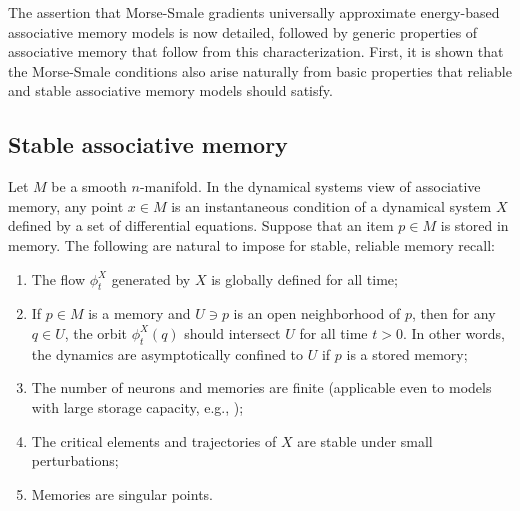 \documentclass[12pt]{article}
\begin{document}
The assertion that Morse-Smale gradients universally approximate energy-based associative memory models is now detailed, followed by generic properties of associative memory that follow from this characterization. First, it is shown that the Morse-Smale conditions also arise naturally from basic properties that reliable and stable associative memory models should satisfy.

\subsection{Stable associative memory}
\label{subsection:general-aspects-of-associative-memory}

Let $M$ be a smooth $n$-manifold. In the dynamical systems view of associative memory, any point $x \in M$ is an instantaneous condition of a dynamical system $X$ defined by a set of differential equations. Suppose that an item $p\in M$ is stored in memory. The following are natural to impose for stable, reliable memory recall: 
\begin{enumerate}[itemsep=0pt]
    \item The flow $\phi_t^X$ generated by $X$ is globally defined for all time;
    \item If $p \in M$ is a memory and $U \ni p$ is an open neighborhood of $p$, then for any $q\in U$, the orbit $\phi_t^X(q)$ should intersect $U$ for all time $t > 0$. In other words, the dynamics are asymptotically confined to $U$ if $p$ is a stored memory;
    \item The number of neurons and memories are finite (applicable even to models with large storage capacity, e.g., \cite{krotov2016dense,ramsauer2020hopfield}); 
    \item The critical elements and trajectories of $X$ are stable under small perturbations;
    \item Memories are singular points.
\end{enumerate}

\end{document}
